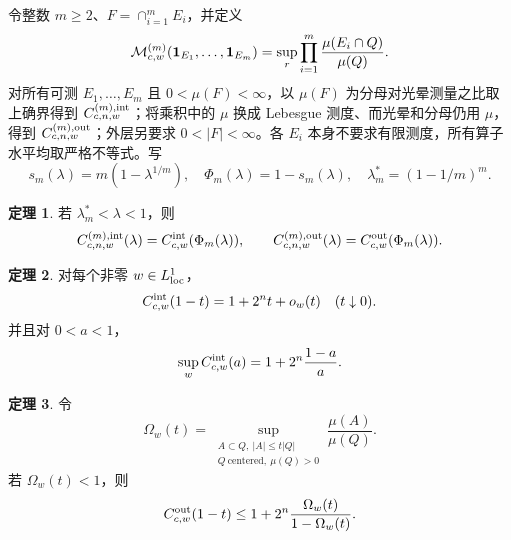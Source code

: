 \documentclass[UTF8,11pt,fontset=none]{ctexart}
\theoremstyle{definition}\newtheorem{theorem}{定理}[section]\newtheorem{lemma}[theorem]{引理}\newtheorem{corollary}[theorem]{推论}\newtheorem{proposition}[theorem]{命题}
\theoremstyle{remark}\newtheorem{remark}[theorem]{说明}
\begin{document}
令整数 $m\ge2$、$F=\cap_{i=1}^mE_i$，并定义
\[
 \mathcal M^{(m)}_{c,w}(\mathbf 1_{E_1},\ldots,\mathbf 1_{E_m})=
 \sup_r\prod_{i=1}^m\frac{\mu(E_i\cap Q)}{\mu(Q)}.
\]
对所有可测 $E_1,\ldots,E_m$ 且 $0<\mu(F)<\infty$，以 $\mu(F)$ 为分母对光晕测量之比取上确界得到 $C^{(m),\rm int}_{c,n,w}$；将乘积中的 $\mu$ 换成 Lebesgue 测度、而光晕和分母仍用 $\mu$，得到 $C^{(m),\rm out}_{c,n,w}$；外层另要求 $0<|F|<\infty$。各 $E_i$ 本身不要求有限测度，所有算子水平均取严格不等式。写
\[
 s_m(\lambda)=m(1-\lambda^{1/m}),\quad\Phi_m(\lambda)=1-s_m(\lambda),\quad
 \lambda_m^*=(1-1/m)^m.
\]
\begin{theorem}\label{transfer}若 $\lambda_m^*<\lambda<1$，则
\[
C^{(m),\rm int}_{c,n,w}(\lambda)=C^{\rm int}_{c,w}(\Phi_m(\lambda)),\qquad
C^{(m),\rm out}_{c,n,w}(\lambda)=C^{\rm out}_{c,w}(\Phi_m(\lambda)).
\]
\end{theorem}
\begin{theorem}\label{endpoint}对每个非零 $w\in L^1_{\rm loc}$，
\[C^{\rm int}_{c,w}(1-t)=1+2^nt+o_w(t)\quad(t\downarrow0).\]
并且对 $0<a<1$，\[\sup_wC^{\rm int}_{c,w}(a)=1+2^n\frac{1-a}{a}.\]
\end{theorem}
\begin{theorem}\label{outer}令
\[\Omega_w(t)=\sup_{\substack{A\subset Q,\ |A|\le t|Q|\\Q\ \mathrm{centered},\ \mu(Q)>0}}\frac{\mu(A)}{\mu(Q)}.\]
若 $\Omega_w(t)<1$，则\[C^{\rm out}_{c,w}(1-t)\le1+2^n\frac{\Omega_w(t)}{1-\Omega_w(t)}.\]
\end{theorem}
\end{document}
